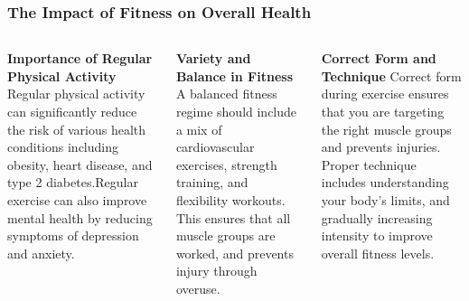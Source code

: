 \documentclass[5pt]{beamer}
\begin{document}
\begin{frame}
\frametitle{The Impact of Fitness on Overall Health}
\begin{columns}
\begin{column}{0.3\textwidth}
\begin{block}{\textbf{Importance of Regular Physical Activity}}
Regular physical activity can significantly reduce the risk of various health conditions including obesity, heart disease, and type 2 diabetes.Regular exercise can also improve mental health by reducing symptoms of depression and anxiety.
\end{block}
\end{column}
\begin{column}{0.3\textwidth}
\begin{block}{\textbf{Variety and Balance in Fitness}}
A balanced fitness regime should include a mix of cardiovascular exercises, strength training, and flexibility workouts. This ensures that all muscle groups are worked, and prevents injury through overuse.
\end{block}
\end{column}
\begin{column}{0.3\textwidth}
\begin{block}{\textbf{Correct Form and Technique}}
Correct form during exercise ensures that you are targeting the right muscle groups and prevents injuries. Proper technique includes understanding your body's limits, and gradually increasing intensity to improve overall fitness levels.
\end{block}
\end{column}
\end{columns}
\end{frame}
\end{document}
